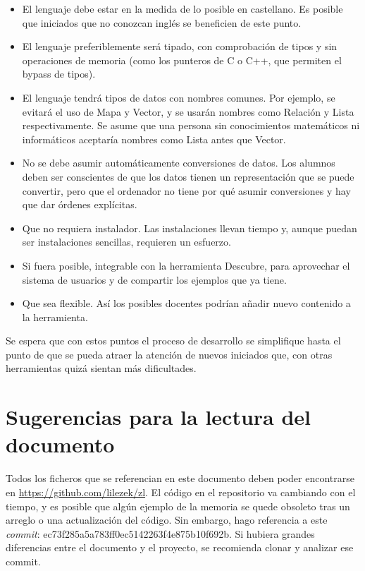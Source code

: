 \documentclass{report}
\begin{document}
	\begin{itemize}
		\item El lenguaje debe estar en la medida de lo posible en castellano. Es posible que iniciados que no conozcan inglés se beneficien de este punto.
		\item El lenguaje preferiblemente será tipado, con comprobación de tipos \cite{statictypecheck}\cite{typesafety} y sin operaciones de memoria \cite{memorysafety} (como los punteros de C o C++, que permiten el bypass de tipos). 
		\item El lenguaje tendrá tipos de datos con nombres comunes. Por ejemplo, se evitará el uso de Mapa y Vector, y se usarán nombres como Relación y Lista respectivamente. Se asume que una persona sin conocimientos matemáticos ni informáticos aceptaría nombres como Lista antes que Vector.
		\item No se debe asumir automáticamente conversiones de datos. Los alumnos deben ser conscientes de que los datos tienen un representación que se puede convertir, pero que el ordenador no tiene por qué asumir conversiones y hay que dar órdenes explícitas.
		\item Que no requiera instalador. Las instalaciones llevan tiempo y, aunque puedan ser instalaciones sencillas, requieren un esfuerzo.
		\item Si fuera posible, integrable con la herramienta Descubre, para aprovechar el sistema de usuarios y de compartir los ejemplos que ya tiene.
		\item Que sea flexible. Así los posibles docentes podrían añadir nuevo contenido a la herramienta.  
	\end{itemize} 
	
	\vspace{10px}
	
	Se espera que con estos puntos el proceso de desarrollo se simplifique hasta el punto de que se pueda atraer la atención de nuevos iniciados que, con otras herramientas quizá sientan más dificultades. 
	
	\section{Sugerencias para la lectura del documento}
	
	Todos los ficheros que se referencian en este documento deben poder encontrarse en \href{https://github.com/lilezek/zl}{https://github.com/lilezek/zl}. El código en el repositorio va cambiando con el tiempo, y es posible que algún ejemplo de la memoria se quede obsoleto tras un arreglo o una actualización del código. Sin embargo, hago referencia a este \textit{commit}: ec73f285a5a783ff0ec5142263f4e875b10f692b. Si hubiera grandes diferencias entre el documento y el proyecto, se recomienda clonar y analizar ese commit.
	
\end{document}
